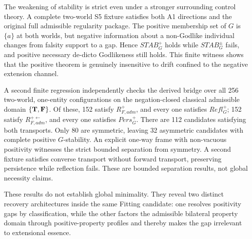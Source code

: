The weakening of stability is strict even under a stronger surrounding control theory. A complete two-world S5 fixture satisfies both A1 directions and the original full admissible regularity package. The positive membership set of \(G\) is \(\{a\}\) at both worlds, but negative information about a non-Godlike individual changes from falsity support to a gap. Hence \(STAB_G^+\) holds while \(STAB_G^{\pm}\) fails, and positive necessary de-dicto Godlikeness still holds. This finite witness shows that the positive theorem is genuinely insensitive to drift confined to the negative extension channel.

A second finite regression independently checks the derived bridge over all 256 two-world, one-entity configurations on the negation-closed classical admissible domain \(\{\mathbf{T},\mathbf{F}\}\). Of these, 152 satisfy \(R_{F,adm}^+\), and every one satisfies \(Refl_G^+\); 152 satisfy \(R_{F,adm}^{+\leftarrow}\), and every one satisfies \(Pers_G^+\). There are 112 candidates satisfying both transports. Only 80 are symmetric, leaving 32 asymmetric candidates with complete positive \(G\)-stability. An explicit one-way frame with non-vacuous positivity witnesses the strict bounded separation from symmetry. A second fixture satisfies converse transport without forward transport, preserving persistence while reflection fails. These are bounded separation results, not global necessity claims.

These results do not establish global minimality. They reveal two distinct recovery architectures inside the same Fitting candidate: one resolves positivity gaps by classification, while the other factors the admissible bilateral property domain through positive-property profiles and thereby makes the gap irrelevant to extensional essence.
